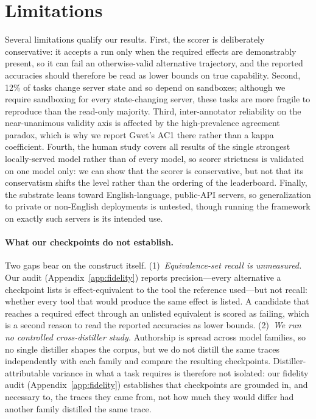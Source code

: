 \section*{Limitations}
\label{sec:limitations}
Several limitations qualify our results. First, the scorer is deliberately
conservative: it accepts a run only when the required effects are
demonstrably present, so it can fail an otherwise-valid alternative
trajectory, and the reported accuracies should therefore be read as
lower bounds on true capability. Second, 12\% of tasks change server
state and so depend on sandboxes; although we require sandboxing for every
state-changing server, these tasks are more fragile to reproduce than the
read-only majority. Third, inter-annotator reliability on the near-unanimous
validity axis is affected by the high-prevalence agreement paradox, which is
why we report Gwet's AC1 there rather than a kappa coefficient. Fourth, the
human study covers all results of the single strongest locally-served model
rather than of every model, so scorer strictness is validated on one model
only: we can show that the scorer is conservative, but not that its
conservatism shifts the level rather than the ordering of the leaderboard.
Finally, the substrate leans toward
English-language, public-API servers, so generalization to private or
non-English deployments is untested, though running the framework on exactly
such servers is its intended use.

\paragraph{What our checkpoints do not establish.} Two gaps bear on the
construct itself. (1)~\emph{Equivalence-set recall is unmeasured.} Our audit
(Appendix~\ref{app:fidelity}) reports precision---every alternative a
checkpoint lists is effect-equivalent to the tool the reference used---but not
recall: whether every tool that would produce the same effect is listed. A candidate that reaches a required effect
through an unlisted equivalent is scored as failing, which is a second reason
to read the reported accuracies as lower bounds. (2)~\emph{We run no controlled
cross-distiller study.} Authorship is spread across model families, so no
single distiller shapes the corpus, but we do not distill the same traces
independently with each family and compare the resulting checkpoints.
Distiller-attributable variance in what a task requires is therefore not
isolated: our fidelity audit (Appendix~\ref{app:fidelity}) establishes that
checkpoints are grounded in, and necessary to, the traces they came from, not
how much they would differ had another family distilled the same trace.

